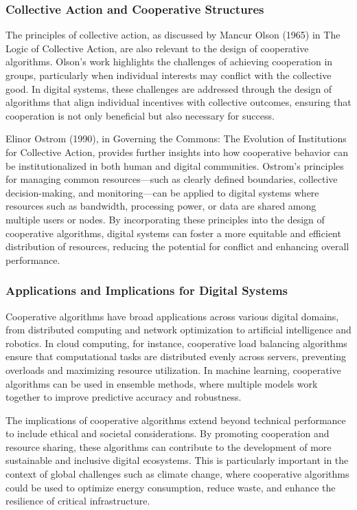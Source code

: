 \documentclass[12pt,twoside]{article}
\begin{document}
\subsubsection{Collective Action and Cooperative Structures}

The principles of collective action, as discussed by Mancur Olson (1965) in The Logic of Collective Action, are also relevant to the design of cooperative algorithms. Olson’s work highlights the challenges of achieving cooperation in groups, particularly when individual interests may conflict with the collective good. In digital systems, these challenges are addressed through the design of algorithms that align individual incentives with collective outcomes, ensuring that cooperation is not only beneficial but also necessary for success.

Elinor Ostrom (1990), in Governing the Commons: The Evolution of Institutions for Collective Action, provides further insights into how cooperative behavior can be institutionalized in both human and digital communities. Ostrom’s principles for managing common resources—such as clearly defined boundaries, collective decision-making, and monitoring—can be applied to digital systems where resources such as bandwidth, processing power, or data are shared among multiple users or nodes. By incorporating these principles into the design of cooperative algorithms, digital systems can foster a more equitable and efficient distribution of resources, reducing the potential for conflict and enhancing overall performance.

\subsubsection{Applications and Implications for Digital Systems}

Cooperative algorithms have broad applications across various digital domains, from distributed computing and network optimization to artificial intelligence and robotics. In cloud computing, for instance, cooperative load balancing algorithms ensure that computational tasks are distributed evenly across servers, preventing overloads and maximizing resource utilization. In machine learning, cooperative algorithms can be used in ensemble methods, where multiple models work together to improve predictive accuracy and robustness.

The implications of cooperative algorithms extend beyond technical performance to include ethical and societal considerations. By promoting cooperation and resource sharing, these algorithms can contribute to the development of more sustainable and inclusive digital ecosystems. This is particularly important in the context of global challenges such as climate change, where cooperative algorithms could be used to optimize energy consumption, reduce waste, and enhance the resilience of critical infrastructure.
\end{document}
